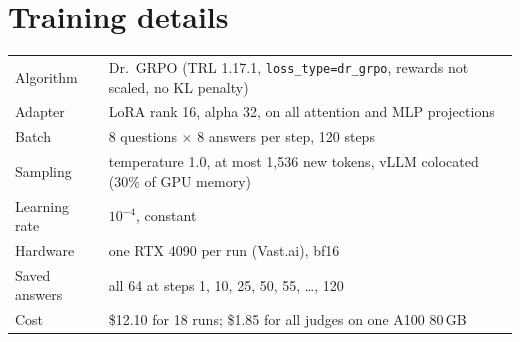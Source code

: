 \documentclass[10pt]{article}
\begin{document}
\section{Training details}
\begin{table}[H]
\centering\small
\begin{tabular}{l l}
\toprule
Algorithm & Dr.\ GRPO (TRL 1.17.1, \texttt{loss\_type=dr\_grpo}, rewards not scaled, no KL penalty) \\
Adapter & LoRA rank 16, alpha 32, on all attention and MLP projections \\
Batch & 8 questions $\times$ 8 answers per step, 120 steps \\
Sampling & temperature 1.0, at most 1,536 new tokens, vLLM colocated (30\% of GPU memory) \\
Learning rate & $10^{-4}$, constant \\
Hardware & one RTX 4090 per run (Vast.ai), bf16 \\
Saved answers & all 64 at steps 1, 10, 25, 50, 55, \ldots, 120 \\
Cost & \$12.10 for 18 runs; \$1.85 for all judges on one A100 80\,GB \\
\bottomrule
\end{tabular}
\end{table}
\end{document}
